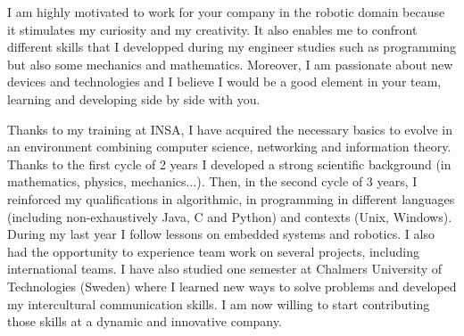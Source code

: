 \documentclass[11pt, a4paper]{awesome-cv}
\begin{document}
\begin{cvletter}
I am highly motivated to work for your company in the robotic domain because it stimulates my curiosity and my creativity. It also enables me to confront different skills that I developped during my engineer studies such as programming but also some mechanics and mathematics. %
Moreover, I am passionate about new devices and technologies and I believe I would be a good element in your team, learning and developing side by side with you. 

\vspace{1mm} %

Thanks to my training at INSA, I have acquired the necessary basics to evolve in an environment combining computer science, networking and information theory. Thanks to the first cycle of 2 years I developed a strong scientific background (in mathematics, physics, mechanics...). Then, in the second cycle of 3 years, I reinforced my qualifications in algorithmic, in programming in different languages (including non-exhaustively Java, C and Python) and contexts (Unix, Windows). During my last year I follow lessons on embedded systems and robotics. I also had the opportunity to experience team work on several projects, including international teams. I have also studied one semester at Chalmers University of Technologies (Sweden) where I learned new ways to solve problems and developed my intercultural communication skills. 
I am now willing to start contributing those skills at a dynamic and innovative company.%



\end{cvletter}
\end{document}
